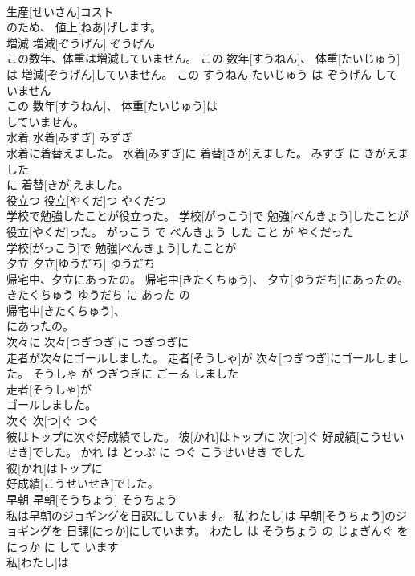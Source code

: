 \documentclass[8pt]{extreport}
\begin{document}
\begin{CJK}{UTF8}{min}
\\	生産[せいさん]コスト
\\	のため、 値上[ねあ]げします。			
\\	増減	増減[ぞうげん]	ぞうげん	
\\	この数年、体重は増減していません。	この 数年[すうねん]、 体重[たいじゅう]は 増減[ぞうげん]していません。	この すうねん たいじゅう は ぞうげん して いません	
\\	この 数年[すうねん]、 体重[たいじゅう]は
\\	していません。			
\\	水着	水着[みずぎ]	みずぎ	
\\	水着に着替えました。	水着[みずぎ]に 着替[きが]えました。	みずぎ に きがえました	
\\	に 着替[きが]えました。			
\\	役立つ	役立[やくだ]つ	やくだつ	
\\	学校で勉強したことが役立った。	学校[がっこう]で 勉強[べんきょう]したことが 役立[やくだ]った。	がっこう で べんきょう した こと が やくだった	
\\	学校[がっこう]で 勉強[べんきょう]したことが
\\	夕立	夕立[ゆうだち]	ゆうだち	
\\	帰宅中、夕立にあったの。	帰宅中[きたくちゅう]、 夕立[ゆうだち]にあったの。	きたくちゅう ゆうだち に あった の	
\\	帰宅中[きたくちゅう]、
\\	にあったの。			
\\	次々に	次々[つぎつぎ]に	つぎつぎに	
\\	走者が次々にゴールしました。	走者[そうしゃ]が 次々[つぎつぎ]にゴールしました。	そうしゃ が つぎつぎに ごーる しました	
\\	走者[そうしゃ]が
\\	ゴールしました。			
\\	次ぐ	次[つ]ぐ	つぐ	
\\	彼はトップに次ぐ好成績でした。	彼[かれ]はトップに 次[つ]ぐ 好成績[こうせいせき]でした。	かれ は とっぷ に つぐ こうせいせき でした	
\\	彼[かれ]はトップに
\\	好成績[こうせいせき]でした。			
\\	早朝	早朝[そうちょう]	そうちょう	
\\	私は早朝のジョギングを日課にしています。	私[わたし]は 早朝[そうちょう]のジョギングを 日課[にっか]にしています。	わたし は そうちょう の じょぎんぐ を にっか に して います	
\\	私[わたし]は

\end{CJK}
\end{document}
